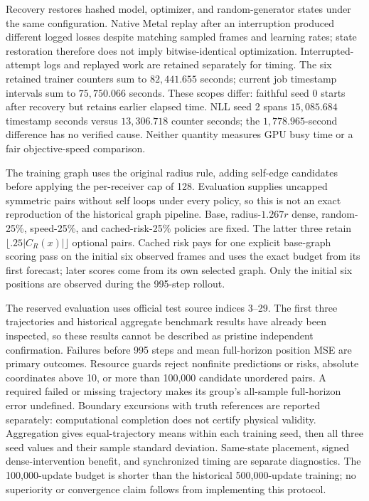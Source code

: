 Recovery restores hashed model, optimizer, and random-generator states under
the same configuration. Native Metal replay after an interruption produced
different logged losses despite matching sampled frames and learning rates;
state restoration therefore does not imply bitwise-identical optimization.
Interrupted-attempt logs and replayed work are retained separately for timing.
The six retained trainer counters sum to $82{,}441.655$ seconds; current
job timestamp intervals sum to $75{,}750.066$ seconds. These scopes differ:
faithful seed 0 starts after recovery but retains earlier elapsed time.
NLL seed 2 spans $15{,}085.684$ timestamp seconds versus $13{,}306.718$
counter seconds; the $1{,}778.965$-second difference has no verified cause.
Neither quantity measures GPU busy time or a fair objective-speed comparison.

The training graph uses the original radius rule, adding self-edge candidates before applying the per-receiver cap of 128.
Evaluation supplies uncapped symmetric pairs without self loops under every
policy, so this is not an exact reproduction of the historical graph pipeline.
Base, radius-$1.267r$ dense, random-25\%, speed-25\%, and cached-risk-25\%
policies are fixed. The latter three retain
$\lfloor.25|C_R(x)|\rfloor$ optional pairs. Cached risk pays for one explicit
base-graph scoring pass on the initial six observed frames and uses the exact
budget from its first forecast; later scores come from its own selected graph.
Only the initial six positions are observed during the 995-step rollout.

The reserved evaluation uses official test source indices 3--29. The first
three trajectories and historical aggregate benchmark results have already
been inspected, so these results cannot be described as pristine independent
confirmation. Failures before 995 steps and mean full-horizon position MSE
are primary outcomes. Resource guards reject nonfinite predictions or risks,
absolute coordinates above 10, or more than 100,000 candidate unordered pairs.
A required failed or missing trajectory makes its group's all-sample
full-horizon error undefined. Boundary excursions with truth references are
reported separately: computational completion does not certify physical
validity. Aggregation gives equal-trajectory means within each training seed,
then all three seed values and their sample standard deviation. Same-state
placement, signed dense-intervention benefit, and synchronized timing are
separate diagnostics. The 100,000-update budget is shorter than the historical
500,000-update training; no superiority or convergence claim follows from
implementing this protocol.


